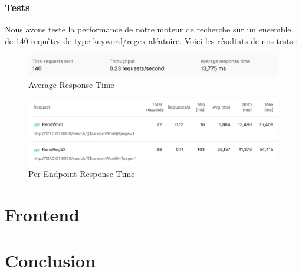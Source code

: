 \documentclass[
  12pt,
]{article}
\begin{document}
\subsubsection{Tests}\label{tests}

Nous avons testé la performance de notre moteur de recherche sur un
ensemble de 140 requêtes de type keyword/regex aléatoire. Voici les
résultats de nos tests :

\begin{figure}
\centering
\includegraphics{./avgTotal.png}
\caption{Average Response Time}
\end{figure}

\begin{figure}
\centering
\includegraphics{./avgPerEndPoint.png}
\caption{Per Endpoint Response Time}
\end{figure}

\section{Frontend}\label{frontend-2}

\section{Conclusion}\label{conclusion}
\end{document}
